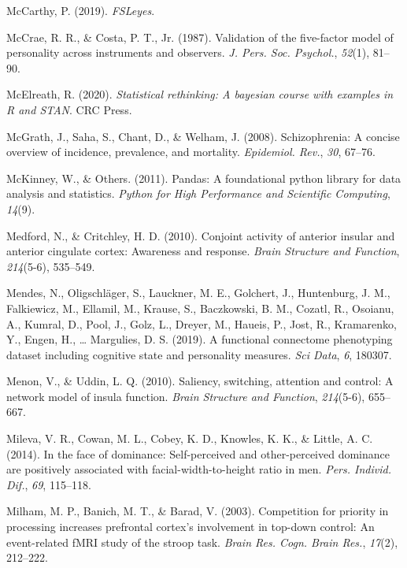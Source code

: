 \documentclass[11pt,american,a4paper,oneside,]{memoir} %
\begin{document}
\leavevmode\hypertarget{ref-McCarthy2019-yt}{}%
McCarthy, P. (2019). \emph{FSLeyes}.

\leavevmode\hypertarget{ref-McCrae1987-ww}{}%
McCrae, R. R., \& Costa, P. T., Jr. (1987). Validation of the five-factor model of personality across instruments and observers. \emph{J. Pers. Soc. Psychol.}, \emph{52}(1), 81--90.

\leavevmode\hypertarget{ref-McElreath2020-pz}{}%
McElreath, R. (2020). \emph{Statistical rethinking: A bayesian course with examples in R and STAN}. CRC Press.

\leavevmode\hypertarget{ref-McGrath2008-oj}{}%
McGrath, J., Saha, S., Chant, D., \& Welham, J. (2008). Schizophrenia: A concise overview of incidence, prevalence, and mortality. \emph{Epidemiol. Rev.}, \emph{30}, 67--76.

\leavevmode\hypertarget{ref-McKinney2011-kl}{}%
McKinney, W., \& Others. (2011). Pandas: A foundational python library for data analysis and statistics. \emph{Python for High Performance and Scientific Computing}, \emph{14}(9).

\leavevmode\hypertarget{ref-medford2010conjoint}{}%
Medford, N., \& Critchley, H. D. (2010). Conjoint activity of anterior insular and anterior cingulate cortex: Awareness and response. \emph{Brain Structure and Function}, \emph{214}(5-6), 535--549.

\leavevmode\hypertarget{ref-Mendes2019-yh}{}%
Mendes, N., Oligschläger, S., Lauckner, M. E., Golchert, J., Huntenburg, J. M., Falkiewicz, M., Ellamil, M., Krause, S., Baczkowski, B. M., Cozatl, R., Osoianu, A., Kumral, D., Pool, J., Golz, L., Dreyer, M., Haueis, P., Jost, R., Kramarenko, Y., Engen, H., \ldots{} Margulies, D. S. (2019). A functional connectome phenotyping dataset including cognitive state and personality measures. \emph{Sci Data}, \emph{6}, 180307.

\leavevmode\hypertarget{ref-menon2010saliency}{}%
Menon, V., \& Uddin, L. Q. (2010). Saliency, switching, attention and control: A network model of insula function. \emph{Brain Structure and Function}, \emph{214}(5-6), 655--667.

\leavevmode\hypertarget{ref-Mileva2014-ld}{}%
Mileva, V. R., Cowan, M. L., Cobey, K. D., Knowles, K. K., \& Little, A. C. (2014). In the face of dominance: Self-perceived and other-perceived dominance are positively associated with facial-width-to-height ratio in men. \emph{Pers. Individ. Dif.}, \emph{69}, 115--118.

\leavevmode\hypertarget{ref-Milham2003-zc}{}%
Milham, M. P., Banich, M. T., \& Barad, V. (2003). Competition for priority in processing increases prefrontal cortex's involvement in top-down control: An event-related fMRI study of the stroop task. \emph{Brain Res. Cogn. Brain Res.}, \emph{17}(2), 212--222.
\end{document}
